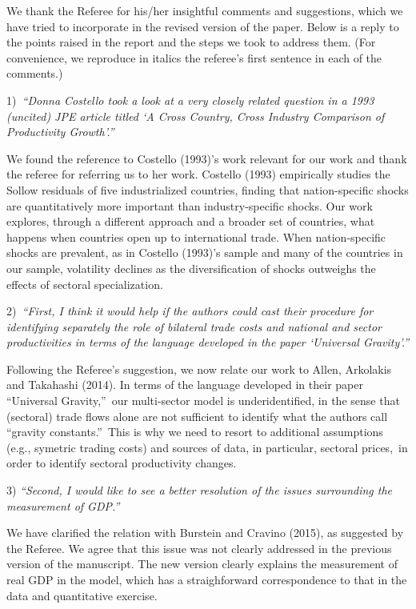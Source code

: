 \documentclass[12pt]{article}
\begin{document}
We thank the Referee for his/her insightful comments and suggestions, which
we have tried to incorporate in the revised version of the paper. Below is a
reply to the points raised in the report and the steps we took to address
them. (For convenience, we reproduce in italics the referee's first sentence
in each of the comments.)\bigskip

1)\textit{\ \textquotedblleft Donna Costello took a look at a very closely
related question in a 1993 (uncited) JPE article titled `A Cross Country,
Cross Industry Comparison of Productivity Growth'.\textquotedblright }

We found the reference to Costello (1993)'s work relevant for our work and
thank the referee for referring us to her work. Costello (1993) empirically
studies the Sollow residuals of five industrialized countries, finding that
nation-specific shocks are quantitatively more important than
industry-specific shocks. Our work explores, through a different approach
and a broader set of countries, what happens when countries open up to
international trade. When nation-specific shocks are prevalent, as in
Costello (1993)'s sample and many of the countries in our sample, volatility
declines as the diversification of shocks outweighs the effects of sectoral
specialization.\bigskip

2)\textit{\ \textquotedblleft First, I think it would help if the authors
could cast their procedure for identifying separately the role of bilateral
trade costs and national and sector productivities in terms of the language
developed in the paper `Universal Gravity'.\textquotedblright }

Following the Referee's suggestion, we now relate our work to Allen,
Arkolakis and Takahashi (2014). In terms of the language developed in their
paper \textquotedblleft Universal Gravity,\textquotedblright\ our
multi-sector model is underidentified, in the sense that (sectoral) trade
flows alone are not sufficient to identify what the authors call
\textquotedblleft gravity constants.\textquotedblright\ This is why we need
to resort to additional assumptions (e.g., symetric trading costs) and
sources of data, in particular, sectoral prices,\ in order to identify
sectoral productivity changes. \bigskip

3) \textit{\textquotedblleft Second, I would like to see a better resolution
of the issues surrounding the measurement of GDP.\textquotedblright }

We have clarified the relation with Burstein and Cravino (2015), as
suggested by the Referee. We agree that this issue was not clearly addressed
in the previous version of the manuscript. The new version clearly explains
the measurement of real GDP in the model, which has a straighforward
correspondence to that in the data and quantitative exercise.
\end{document}
